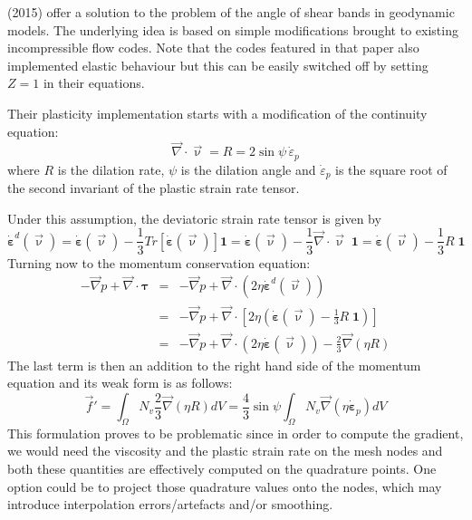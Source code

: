 \textcite{chpe15} (2015) offer a solution to the problem of the angle of shear bands in 
geodynamic models. The underlying idea is based on simple modifications 
brought to existing incompressible flow codes. Note that the codes
featured in that paper also implemented elastic behaviour but this can 
be easily switched off by setting $Z=1$ in their equations.

Their plasticity implementation starts with a modification of the 
continuity equation:
\[
\vec\nabla\cdot\vec\upnu = R = 2 \sin\psi \, \dot{\varepsilon}_p
\]
where $R$ is the dilation rate, $\psi$ is the dilation angle 
and $\dot{\varepsilon}_p$ is the square root of 
the second invariant of the plastic strain rate tensor.

Under this assumption, the deviatoric strain rate tensor is given by
\begin{equation}
\dot{\bm \varepsilon}^d(\vec\upnu)
= \dot{\bm \varepsilon}(\vec\upnu)- \frac{1}{3} Tr[\dot{\bm \varepsilon}(\vec\upnu)] {\bm 1}
= \dot{\bm \varepsilon}(\vec\upnu)- \frac{1}{3} \vec\nabla\cdot\vec\upnu \; {\bm 1}
= \dot{\bm \varepsilon}(\vec\upnu)- \frac{1}{3} R \; {\bm 1}
\end{equation}
Turning now to the momentum conservation equation:
\begin{eqnarray}
-\vec\nabla p + \vec\nabla \cdot {\bm \tau} 
&=& -\vec\nabla p + \vec\nabla \cdot (2 \eta \dot{\bm \varepsilon}^d(\vec\upnu)) \nonumber \\
&=& -\vec\nabla p + \vec\nabla \cdot \left[ 2 \eta \left(\dot{\bm \varepsilon}(\vec\upnu)- \frac{1}{3} R \; {\bm 1}\right) \right] \nonumber\\
&=& -\vec\nabla p 
+ \vec\nabla \cdot \left( 2 \eta \dot{\bm \varepsilon}(\vec\upnu)\right) -\frac{2}{3} \vec\nabla(\eta R) 
\label{chpeform}
\end{eqnarray}
The last term is then an addition to the right hand side of the momentum equation 
and its weak form is as follows:
\begin{equation}
\vec f' 
= \int_\Omega N_v \frac{2}{3} \vec\nabla(\eta R) dV
= \frac{4}{3} \sin \psi \int_\Omega N_v \vec\nabla(\eta \dot{\bm \varepsilon}_p) dV
\end{equation}
This formulation proves to be problematic since in order to compute the gradient, we would
need the viscosity and the plastic strain rate on the mesh nodes and both these quantities
are effectively computed on the quadrature points. One option could be to project those quadrature
values onto the nodes, which may introduce interpolation errors/artefacts and/or smoothing. 
